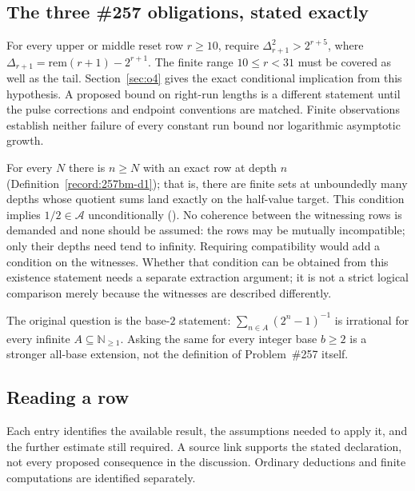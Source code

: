 \subsection{The three \#257 obligations, stated exactly}

\begin{defn}[257-reset]
For every upper or middle reset row $r\ge10$, require
$\Delta_{r+1}^2>2^{r+5}$, where
$\Delta_{r+1}=\mathrm{rem}(r+1)-2^{r+1}$.
The finite range $10\le r<31$ must be covered as well as the tail.
Section~\ref{sec:o4} gives the exact conditional implication from this
hypothesis.  A proposed bound on right-run lengths is a different
statement until the pulse corrections and endpoint conventions are
matched.  Finite observations establish neither failure of every
constant run bound nor logarithmic asymptotic growth.
\end{defn}

\begin{defn}
For every $N$ there is $n\ge N$ with an exact row at depth $n$
(Definition~\ref{record:257bm-d1}); that is, there are finite sets at unboundedly many depths
whose quotient sums land exactly on the half-value target.  This condition implies
$1/2\in\mathcal A$ unconditionally
().
No coherence between the witnessing rows is demanded and none should be assumed: the rows may
be mutually incompatible; only their depths need tend to infinity. Requiring compatibility would add a condition on the witnesses.
Whether that condition can be obtained from this existence statement
needs a separate extraction argument; it is not a strict logical
comparison merely because the witnesses are described differently.
\end{defn}

\begin{defn}[257-universal]
The original question is the base-$2$ statement:
$\sum_{n\in A}(2^n-1)^{-1}$ is irrational for every infinite
$A\subseteq\mathbb N_{\ge1}$.  Asking the same for every integer
base $b\ge2$ is a stronger all-base extension, not the definition of
Problem~\#257 itself.
\end{defn}

\subsection{Reading a row}

Each entry identifies the available result, the assumptions needed to
apply it, and the further estimate still required.  A source link supports
the stated declaration, not every proposed consequence in the discussion.
Ordinary deductions and finite computations are identified separately.


